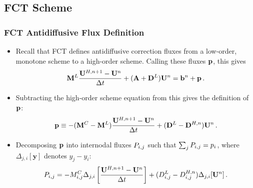 \documentclass{beamer} \useoutertheme{infolines}
\begin{document}
\subsection{FCT Scheme}
\begin{frame}
\frametitle{FCT Antidiffusive Flux Definition}

\begin{itemize}
   \item Recall that FCT defines antidiffusive correction fluxes
      from a low-order, monotone scheme to a high-order scheme. Calling
      these fluxes $\mathbf{p}$, this gives
      \begin{equation}
        \lumpedmassmatrix\frac{\solutionvector^{H,n+1}-\solutionvector^n}{\dt}
          + (\ssmatrix+\diffusionmatrix^L)\solutionvector^n = \ssrhs^n
          + \correctionfluxvector \eqp
      \end{equation}
   \item Subtracting the high-order scheme equation from this gives the
      definition of $\mathbf{p}$:
      \begin{equation}
        \correctionfluxvector \equiv
          -(\consistentmassmatrix-\lumpedmassmatrix)
          \frac{\solutionvector^{H,n+1}-\solutionvector^n}{\dt}
          + (\diffusionmatrix^L-\diffusionmatrix^{H,n})\solutionvector^n \eqp
      \end{equation}
   \item Decomposing $\mathbf{p}$ into internodal fluxes
      $\correctionfluxij$ such that $\sum_j \correctionfluxij =
      \correctionfluxletter_i$, where $\Delta_{j,i}[\mathbf{y}]$
      denotes $y_j - y_i$:
   \begin{equation}
     \correctionfluxij = -M\ij^C\Delta_{j,i}\left[
       \frac{\solutionvector^{H,n+1}-\solutionvector^n}{\Delta t}\right]
       + (D\ij^L-D\ij^{H,n})\Delta_{j,i}[\solutionvector^n] \eqp
   \end{equation}
\end{itemize}

\end{frame}
\end{document}
